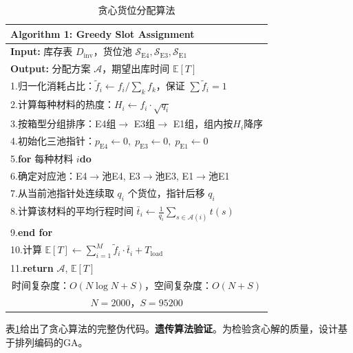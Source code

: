 \documentclass[a4paper]{cumcmthesis}
\newcommand{\headcol}{\rowcolor{tableheadcolor}}
\begin{document}
\begin{table}[htbp]
\centering\footnotesize
\caption{贪心货位分配算法}
\label{tab:algo1}
\begin{tabular}{p{}}
\toprule
\headcol \textbf{Algorithm 1: Greedy Slot Assignment}\\
\midrule
\textbf{Input:} 库存表 $D_{\text{inv}}$，货位池 $\mathcal{S}_{\text{E4}},\mathcal{S}_{\text{E3}},\mathcal{S}_{\text{E1}}$\\
\textbf{Output:} 分配方案 $\mathcal{A}$，期望出库时间 $\mathbb{E}[T]$\\
\midrule
1.\quad 归一化消耗占比：$\tilde{f}_i \gets f_i / \sum_k f_k$，保证 $\sum\tilde{f}_i = 1$\\
2.\quad 计算每种材料的热度：$H_i \gets f_i \cdot \sqrt{q_i}$\\
3.\quad 按箱型分组排序：E4组$\to$ E3组$\to$ E1组，组内按$H_i$降序\\
4.\quad 初始化三池指针：$p_{\text{E4}}\gets 0,\; p_{\text{E3}}\gets 0,\; p_{\text{E1}}\gets 0$\\
5.\quad \textbf{for} 每种材料 $i$\textbf{do}\\
6.\quad\qquad 确定对应池：E4$\to$池E4, E3$\to$池E3, E1$\to$池E1\\
7.\quad\qquad 从当前池指针处连续取 $q_i$ 个货位，指针后移 $q_i$\\
8.\quad\qquad 计算该材料的平均行程时间 $\bar{t}_i \gets \frac{1}{q_i}\sum_{s\in\mathcal{A}(i)} t(s)$\\
9.\quad \textbf{end for}\\
10.\quad 计算 $\mathbb{E}[T] \gets \sum_{i=1}^{M}\tilde{f}_i\cdot\bar{t}_i + T_{\text{load}}$\\
11.\quad \textbf{return} $\mathcal{A}$, $\mathbb{E}[T]$\\
\midrule
\multicolumn{1}{c}{时间复杂度：$O(N\log N + S)$，空间复杂度：$O(N+S)$}\\
\multicolumn{1}{c}{$N=2000$，$S=95200$}\\
\bottomrule
\end{tabular}
\end{table}

表\ref{tab:algo1}给出了贪心算法的完整伪代码。\textbf{遗传算法验证}。为检验贪心解的质量，设计基于排列编码的GA。
\end{document}
